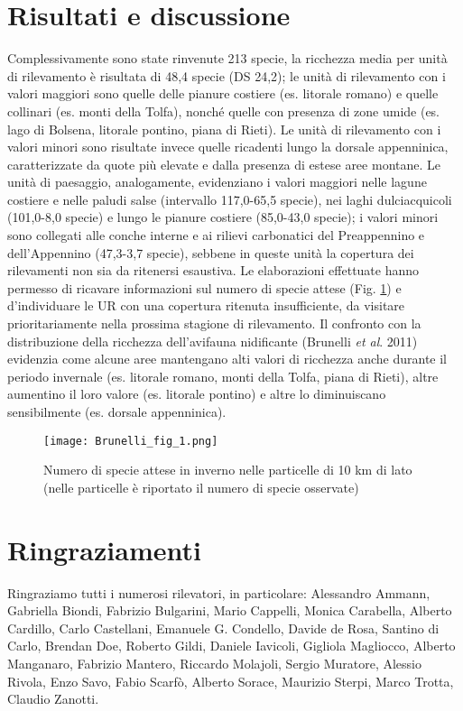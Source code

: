 \section*{Risultati e discussione}
Complessivamente sono state rinvenute 213 specie, la ricchezza media per
unit\`a di rilevamento \`e risultata di 48,4 specie (DS 24,2); le
unit\`a di rilevamento con i valori maggiori sono quelle delle pianure
costiere (es. litorale romano) e quelle collinari (es. monti della
Tolfa), nonch\'e quelle con presenza di zone umide (es. lago di
Bolsena, litorale pontino, piana di Rieti). Le unit\`a di rilevamento
con i valori minori sono risultate invece quelle ricadenti lungo la
dorsale appenninica, caratterizzate da quote pi\`u elevate e dalla
presenza di estese aree montane.
Le unit\`a di paesaggio, analogamente, evidenziano i valori maggiori
nelle lagune costiere e nelle paludi salse (intervallo 117,0-65,5
specie), nei laghi dulciacquicoli (101,0-8,0 specie) e lungo le pianure
costiere (85,0-43,0 specie); i valori minori sono collegati alle conche
interne e ai rilievi carbonatici del Preappennino e
dell{\textquoteright}Appennino (47,3-3,7 specie), sebbene in queste
unit\`a la copertura dei rilevamenti non sia da ritenersi esaustiva.
Le elaborazioni effettuate hanno permesso di ricavare informazioni sul
numero di specie attese (Fig. \ref{Brunelli_fig_1}) e d{\textquoteright}individuare le UR
con una copertura ritenuta insufficiente, da visitare prioritariamente
nella prossima stagione di rilevamento.
Il confronto con la distribuzione della ricchezza
dell{\textquoteright}avifauna nidificante (Brunelli \textit{et al}.
2011) evidenzia come alcune aree mantengano alti valori di ricchezza
anche durante il periodo invernale (es. litorale romano, monti della
Tolfa, piana di Rieti), altre aumentino il loro valore (es. litorale
pontino) e altre lo diminuiscano sensibilmente (es. dorsale
appenninica).

\begin{figure}[!h]
\centering
\texttt{[image: Brunelli\_fig\_1.png]}
\caption{Numero di specie attese in inverno nelle particelle di 10 km di lato (nelle particelle \`e riportato il numero di specie osservate)}
\label{Brunelli_fig_1}
\end{figure}
\section*{Ringraziamenti}
Ringraziamo tutti i numerosi rilevatori, in particolare: Alessandro
Ammann, Gabriella Biondi, Fabrizio Bulgarini, Mario Cappelli, Monica
Carabella, Alberto Cardillo, Carlo Castellani, Emanuele G. Condello,
Davide de Rosa, Santino di Carlo, Brendan Doe, Roberto Gildi, Daniele
Iavicoli, Gigliola Magliocco, Alberto Manganaro, Fabrizio Mantero,
Riccardo Molajoli, Sergio Muratore, Alessio Rivola, Enzo Savo, Fabio
Scarf\`o, Alberto Sorace, Maurizio Sterpi, Marco Trotta, Claudio
Zanotti.
